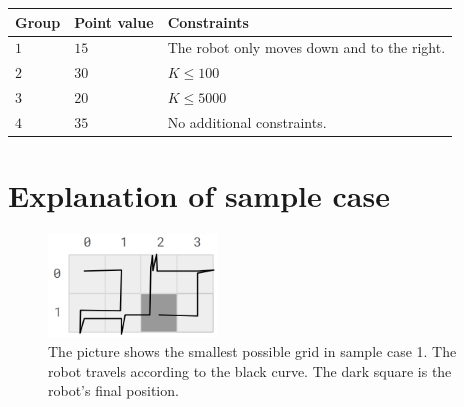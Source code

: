 \noindent
\begin{tabular}{| l | l | p{12cm} |}
  \hline
  \textbf{Group} & \textbf{Point value} & \textbf{Constraints} \\ \hline
  $1$    & $15$       & The robot only moves down and to the right. \\ \hline
  $2$    & $30$       & $K \leq 100$ \\ \hline
  $3$    & $20$       & $K \leq 5000$ \\ \hline
  $4$    & $35$       & No additional constraints. \\ \hline
\end{tabular}


\section*{Explanation of sample case}
\begin{centering}
  \begin{figure}[h]
      \centering
      \includegraphics[width=0.4\textwidth]{golvyta.PNG}
      \caption{The picture shows the smallest possible grid in sample case 1.
      The robot travels according to the black curve.
      The dark square is the robot's final position.}
      \label{fig:enter-label}
  \end{figure}
\end{centering}
